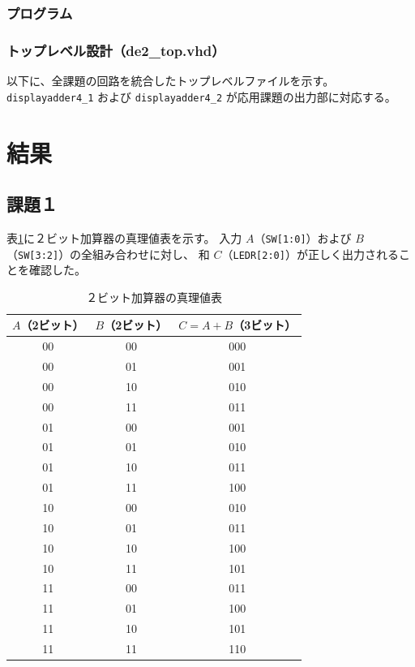 \documentclass[12pt,a4paper]{ltjsarticle}
\begin{document}
\subsubsection{プログラム}


\subsubsection{トップレベル設計（de2\_top.vhd）}\label{subsec:top-level}
以下に、全課題の回路を統合したトップレベルファイルを示す。
\texttt{displayadder4\_1} および \texttt{displayadder4\_2} が応用課題の出力部に対応する。



\section{結果}
\subsection{課題１}

表\ref{tab:adder2bits}に２ビット加算器の真理値表を示す。
入力 $A$（\texttt{SW[1:0]}）および $B$（\texttt{SW[3:2]}）の全組み合わせに対し、
和 $C$（\texttt{LEDR[2:0]}）が正しく出力されることを確認した。

\begin{table}[h]
  \centering
  \caption{２ビット加算器の真理値表}
  \label{tab:adder2bits}
  \begin{tabular}{cc|c}
    \toprule
    $A$（2ビット） & $B$（2ビット） & $C = A + B$（3ビット） \\
    \midrule
    00 & 00 & 000 \\
    00 & 01 & 001 \\
    00 & 10 & 010 \\
    00 & 11 & 011 \\
    01 & 00 & 001 \\
    01 & 01 & 010 \\
    01 & 10 & 011 \\
    01 & 11 & 100 \\
    10 & 00 & 010 \\
    10 & 01 & 011 \\
    10 & 10 & 100 \\
    10 & 11 & 101 \\
    11 & 00 & 011 \\
    11 & 01 & 100 \\
    11 & 10 & 101 \\
    11 & 11 & 110 \\
    \bottomrule
  \end{tabular}
\end{table}
\end{document}
